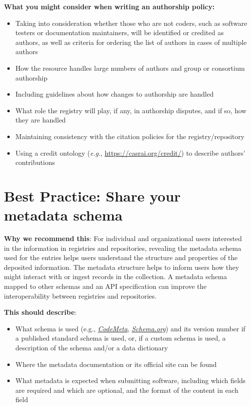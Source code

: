 \documentclass[11pt]{article}
\begin{document}
\textbf{What you might consider when writing an authorship policy:}

\begin{itemize}
\item Taking into consideration whether those who are not coders, such as software testers or documentation maintainers, will be identified or credited as authors, as well as criteria for ordering the list of authors in cases of multiple authors

\item How the resource handles large numbers of authors and group or consortium authorship

\item Including guidelines about how changes to authorship are handled

\item What role the registry will play, if any, in authorship disputes, and if so, how they are handled

\item Maintaining consistency with the citation policies for the registry/repository

\item Using a credit ontology (\emph{e.g.}, \url{https://casrai.org/credit/}) to describe authors' contributions

\end{itemize}


\section{Best Practice: Share your metadata schema}
\label{best-practice-share-your-metadata-schema}

\textbf{Why we recommend this}: For individual and organizational users interested in the information in registries and repositories, revealing the metadata schema used for the entries helps users understand the structure and properties of the deposited information. The metadata structure helps to inform users how they might interact with or ingest records in the collection. A metadata schema mapped to other schemas and an API specification can improve the interoperability between registries and repositories.

\textbf{This should describe}:

\begin{itemize}
\item What schema is used (e.g., \href{https://codemeta.github.io/}{\emph{CodeMeta}}, \href{https://schema.org/}{\emph{Schema.org}}) and its version number if a published standard schema is used, or, if a custom schema is used, a description of the schema and/or a data dictionary

\item Where the metadata documentation or its official site can be found

\item What metadata is expected when submitting software, including which fields are required and which are optional, and the format of the content in each field

\end{itemize}
\end{document}
